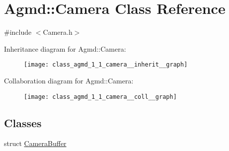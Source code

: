 \hypertarget{class_agmd_1_1_camera}{\section{Agmd\+:\+:Camera Class Reference}
\label{class_agmd_1_1_camera}
}


{\ttfamily \#include $<$Camera.\+h$>$}



Inheritance diagram for Agmd\+:\+:Camera\+:\nopagebreak
\begin{figure}[H]
\begin{center}
\leavevmode
\texttt{[image: class\_agmd\_1\_1\_camera\_\_inherit\_\_graph]}
\end{center}
\end{figure}


Collaboration diagram for Agmd\+:\+:Camera\+:\nopagebreak
\begin{figure}[H]
\begin{center}
\leavevmode
\texttt{[image: class\_agmd\_1\_1\_camera\_\_coll\_\_graph]}
\end{center}
\end{figure}
\subsection*{Classes}
\begin{DoxyCompactItemize}
\item 
struct \hyperlink{struct_agmd_1_1_camera_1_1_camera_buffer}{Camera\+Buffer}
\end{DoxyCompactItemize}
